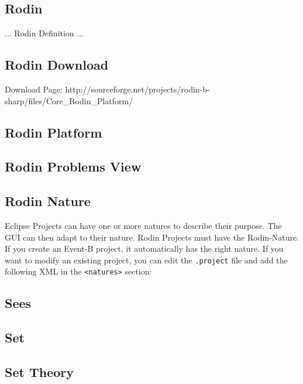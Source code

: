 \subsection{Rodin}
\label{rodin}

... Rodin Definition ...

\subsection{Rodin Download}
\label{rodin_download}

Download Page: http://sourceforge.net/projects/rodin-b-sharp/files/Core\_Rodin\_Platform/


\subsection{Rodin Platform}
\label{rodin_platform}



\subsection{Rodin Problems View}
\label{rodin_problems_view}


\subsection{Rodin Nature}
\label{rodin_nature}

Eclipse Projects can have one or more natures to describe their purpose.  The GUI can then adapt to their nature.  Rodin Projects must have the Rodin-Nature.  If you create an Event-B project, it automatically has the right nature.  If you want to modify an existing project, you can edit the \texttt{.project} file and add the following XML in the \texttt{<natures>} section:


\subsection{Sees}
\label{sees}

\subsection{Set}
\label{set}

\subsection{Set Theory}
\label{set_theory}

